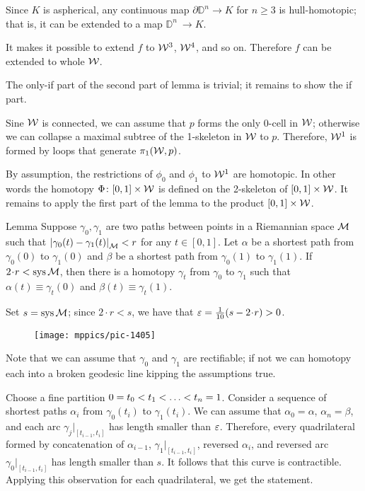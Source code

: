 Since $K$ is aspherical, any continuous map $\partial\mathbb{D}^n\to K$ for $n\ge 3$
is hull-homotopic;
that is, it can be extended to a map $\mathbb{D}^n\:\to K$.

It makes it possible to extend $f$ to $\mathcal{W}^3$, $\mathcal{W}^4$, and so on.
Therefore $f$ can be extended to whole $\mathcal{W}$.

The only-if part of the second part of lemma is trivial;
it remains to show the if part.

Sine $\mathcal{W}$ is connected, we can assume that $p$ forms the only 0-cell in $\mathcal{W}$;
otherwise we can collapse a maximal subtree of the 1-skeleton in $\mathcal{W}$ to $p$.
Therefore, $\mathcal{W}^1$ is formed by loops that generate $\pi_1(\mathcal{W},p)$.

By assumption, the restrictions of $\phi_0$ and $\phi_1$ to $\mathcal{W}^1$ are homotopic.
In other words the homotopy $\Phi\colon[0,1]\times \mathcal{W}$ is defined on the 2-skeleton of $[0,1]\times \mathcal{W}$.
It remains to apply the first part of the lemma to the product $[0,1]\times \mathcal{W}$.
\qeds



\begin{thm}{Lemma}\label{lem:sys-homotopy}
Suppose $\gamma_0,\gamma_1$ are two paths between points in a Riemannian space $\mathcal{M}$ such that $\dist{\gamma_0(t)}{\gamma_1(t)}{\spc{M}}<r$ for any $t\in[0,1]$.
Let $\alpha$ be a shortest path from $\gamma_0(0)$ to $\gamma_1(0)$ and $\beta$ be a shortest path from $\gamma_0(1)$ to $\gamma_1(1)$. 
If $2\cdot r<\sys\spc{M}$, then there is a homotopy $\gamma_t$ from
$\gamma_0$ to $\gamma_1$ such that $\alpha(t)\equiv \gamma_t(0)$ and $\beta(t)\equiv \gamma_t(1)$.
\end{thm}

Set $s=\mathop{\rm sys}\nolimits\mathcal{M}$; 
since $2\cdot r<s$, we have that $\eps=\tfrac1{10}(s-2\cdot r)>0$.

\begin{wrapfigure}{o}{34mm}
\vskip-0mm
\centering
\texttt{[image: mppics/pic-1405]}
\end{wrapfigure}

Note that we can assume that $\gamma_0$ and $\gamma_1$ are rectifiable;
if not we can homotopy each into a broken geodesic line kipping the assumptions true. 

Choose a fine partition $0\z=t_0\z<t_1\z<\z\dots\z<t_n=1$.
Consider a sequence of shortest paths $\alpha_i$ from $\gamma_0(t_i)$ to $\gamma_1(t_i)$.
We can assume that $\alpha_0=\alpha$, $\alpha_n=\beta$, and each arc $\gamma_j|_{[t_{i-1},t_i]}$ has length smaller than $\varepsilon$.
Therefore, every quadrilateral formed by concatenation  of $\alpha_{i-1}$, $\gamma_1|_{[t_{i-1},t_i]}$, reversed $\alpha_i$, and reversed arc $\gamma_0|_{[t_{i-1},t_i]}$ has length smaller than $s$.
It follows that this curve is contractible.
Applying this observation for each quadrilateral, we get the statement.
\qeds


